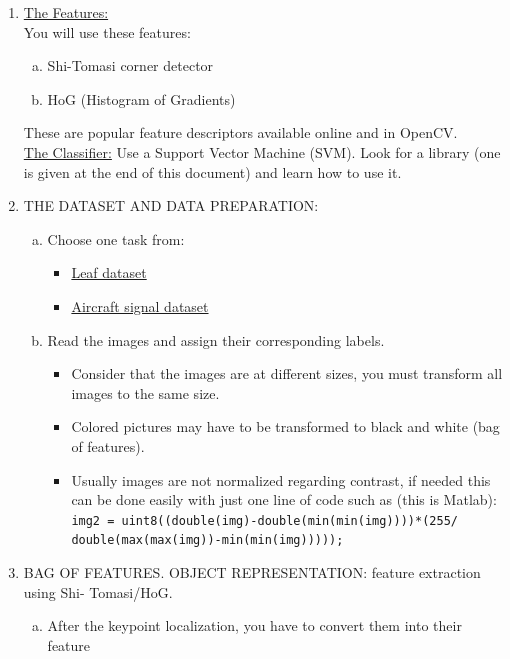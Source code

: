 \documentclass[UTF-8]{article}
\begin{document}
\begin{enumerate}[1.]
		\item \underline{The Features:}\\
		You will use these features:
		\begin{enumerate}[a.]
			\item Shi-Tomasi corner detector
			\item HoG (Histogram of Gradients)
		\end{enumerate}
		These are popular feature descriptors available online and in OpenCV.\\
		\underline{The Classifier:} Use a Support Vector Machine (SVM). Look for a library (one is given 
		at the end of this document) and learn how to use it.
		\item THE DATASET AND DATA PREPARATION:\\
		\begin{enumerate}[a.]
			\item Choose one task from:
			\begin{itemize}
				\item \href{https://data.mendeley.com/datasets/hb74ynkjcn/1}{Leaf dataset}
				\item \href{https://github.com/yalesong/natops}{Aircraft signal dataset}
			\end{itemize}
			\item Read the images and assign their corresponding labels.
			\begin{itemize}
				\item Consider  that  the  images  are  at  different  sizes,  you  must  transform  all 
				images to the same size.
				\item Colored  pictures  may  have  to  be  transformed  to  black  and  white  (bag  of 
				features).
				\item Usually  images  are  not  normalized  regarding  contrast,  if  needed  this  can 
				be done easily with just one line of code such as (this is Matlab):\\
				\verb|img2 = uint8((double(img)-double(min(min(img))))*(255/|\\
				\verb|double(max(max(img))-min(min(img)))));|
			\end{itemize}
		\end{enumerate}
		\item BAG  OF  FEATURES.  OBJECT  REPRESENTATION:
		  feature  extraction  using  Shi-
		Tomasi/HoG.
		\begin{enumerate}[a.]
			\item After  the  keypoint  localization,  you  have  to  convert  them  into  their  feature 

\end{enumerate}
\end{enumerate}
\end{document}
